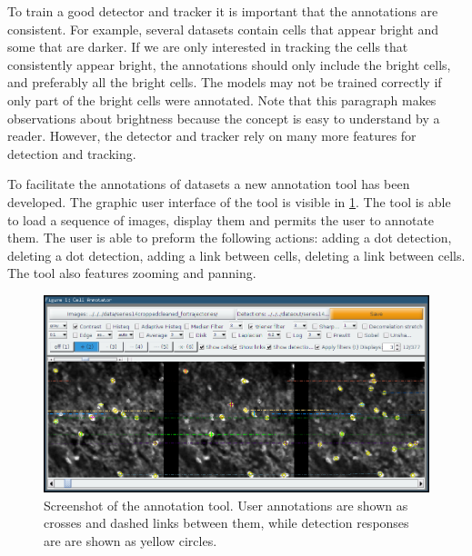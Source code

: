     	To train a good detector and tracker it is important that the annotations are consistent. For example, several datasets contain cells that appear bright and some that are darker. If we are only interested in tracking the cells that consistently appear bright, the annotations should only include the bright cells, and preferably all the bright cells. The models may not be trained correctly if only part of the bright cells were annotated. Note that this paragraph makes observations about brightness because the concept is easy to understand by a reader. However, the detector and tracker rely on many more features for detection and tracking.
	
		To facilitate the annotations of datasets a new annotation tool has been developed. The graphic user interface of the tool is visible in \cref{fig:data_annotator_screenshot}. The tool is able to load a sequence of images, display them and permits the user to annotate them. The user is able to preform the following actions: adding a dot detection, deleting a dot detection, adding a link between cells, deleting a link between cells. The tool also features zooming and panning.
		

		\begin{figure}
			\includegraphics[width=\textwidth]{images/data_annotator_screenshot}
			\caption{Screenshot of the annotation tool. User annotations are shown as crosses and dashed links between them, while detection responses are are shown as yellow circles.}
			\label{fig:data_annotator_screenshot}
		\end{figure}
		
